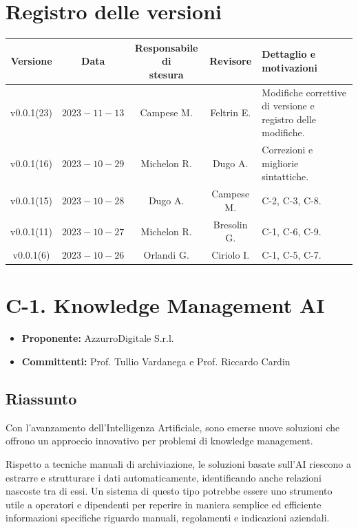 \documentclass{article}
\makeatletter
\newcommand{\quantities}[1]{%
  \begin{tabular}{@{}c@{}}\strut#1\strut\end{tabular}%
}
\makeatother
\begin{document}
{\renewcommand{\arraystretch}{1.5}
\section*{Registro delle versioni}
\begin{tabularx}{\textwidth}{c|c|c|c|X}
\textbf{Versione} & \textbf{Data} & \quantities{\textbf{Responsabile di}\\\textbf{stesura}}& \textbf{Revisore} & \quantities{\textbf{Dettaglio e}\\\textbf{motivazioni}} \\
\hline
v0.0.1(23) & $2023-11-13$ & Campese M. & Feltrin E. & Modifiche correttive di versione e registro delle modifiche. \\
\hline
v0.0.1(16) & $2023-10-29$ &  Michelon R. & Dugo A. & Correzioni e migliorie sintattiche.\\
\hline
v0.0.1(15) & $2023-10-28$ & Dugo A. & Campese M. & C-2, C-3, C-8.\\
\hline
v0.0.1(11) & $2023-10-27$ & Michelon R. & Bresolin G. & C-1, C-6, C-9.\\
\hline
v0.0.1(6) & $2023-10-26$ & Orlandi G. & Ciriolo I. &  C-1, C-5, C-7.\\
\end{tabularx}}
\newpage

\tableofcontents
\newpage

\section{C-1. Knowledge Management AI}
\begin{itemize}
    \item \textbf{Proponente:} AzzurroDigitale S.r.l.
    \item \textbf{Committenti:} Prof. Tullio Vardanega e Prof. Riccardo Cardin
\end{itemize}

\subsection{Riassunto}
Con l’avanzamento dell’Intelligenza Artificiale, sono emerse nuove soluzioni che offrono un approccio innovativo per problemi di knowledge management.


Rispetto a tecniche manuali di archiviazione, le soluzioni basate sull’AI riescono a estrarre e strutturare i dati automaticamente, identificando anche relazioni nascoste tra di essi. 
Un sistema di questo tipo potrebbe essere uno strumento utile a operatori e dipendenti per reperire in maniera semplice ed efficiente informazioni specifiche riguardo manuali, regolamenti e indicazioni aziendali.
\end{document}
